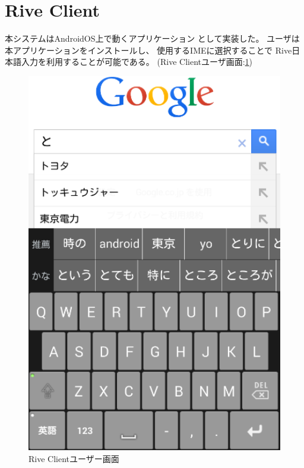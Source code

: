 \section{Rive Client}
\label{sec:riveclient}
本システムはAndroidOS上で動くアプリケーション
として実装した。
ユーザは本アプリケーションをインストールし、
使用するIMEに選択することで
Rive日本語入力を利用することが可能である。
(Rive Clientユーザ画面:\ref{fig:riveclient})
\begin{figure}[htbp]
  \begin{center}
    \includegraphics[width=140mm,bb=0 0 390 578]{images/riveclient.png}
  \end{center}
  \caption{Rive Clientユーザー画面}
  \label{fig:riveclient}
\end{figure}

